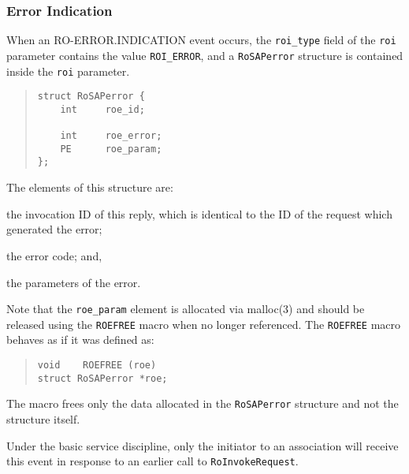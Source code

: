 \subsubsection  {Error Indication}
When an {\sf RO-ERROR.INDICATION\/} event occurs,
the \verb"roi_type" field of the \verb"roi" parameter contains the value
\verb"ROI_ERROR",
and a \verb"RoSAPerror" structure is contained inside the \verb"roi"
parameter.
\begin{quote}\small\begin{verbatim}
struct RoSAPerror {
    int     roe_id;

    int     roe_error;
    PE      roe_param;
};
\end{verbatim}\end{quote}
The elements of this structure are:
\begin{describe}
\item[\verb"roe\_id":] the invocation ID of this reply,
which is identical to the ID of the request which generated the error;

\item[\verb"roe\_error":] the error code;
and,

\item[\verb"roe\_param":] the parameters of the error.
\end{describe}
Note that the \verb"roe_param" element is allocated via \man malloc(3) and
should be released using the \verb"ROEFREE" macro  when no longer referenced.
The \verb"ROEFREE" macro behaves as if it was defined as:
\begin{quote}\small\begin{verbatim}
void    ROEFREE (roe)
struct RoSAPerror *roe;
\end{verbatim}\end{quote}
The macro frees only the data allocated in the \verb"RoSAPerror" structure
and not the structure itself.

Under the basic service discipline,
only the initiator to an association will receive this event in response to
an earlier call to \verb"RoInvokeRequest".

